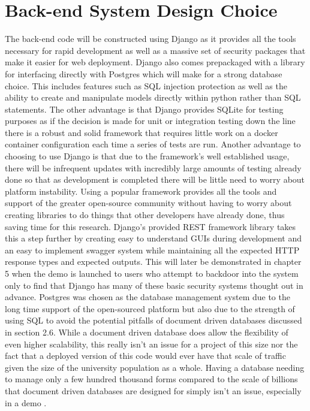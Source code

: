 \section{Back-end System Design Choice}

The back-end code will be constructed using Django as it provides all the tools necessary for rapid development as well as a massive set of security packages that make it easier for web deployment. Django also comes prepackaged with a library for interfacing directly with Postgres which will make for a strong database choice. This includes features such as SQL injection protection as well as the ability to create and manipulate models directly within python rather than SQL statements. The other advantage is that Django provides SQLite for testing purposes as if the decision is made for unit or integration testing down the line there is a robust and solid framework that requires little work on a docker container configuration each time a series of tests are run.
\newline
\newline
Another advantage to choosing to use Django is that due to the framework’s well established usage, there will be infrequent updates with incredibly large amounts of testing already done so that as development is completed there will be little need to worry about platform instability. Using a popular framework provides all the tools and support of the greater open-source community without having to worry about creating libraries to do things that other developers have already done, thus saving time for this research. Django’s provided REST framework library takes this a step further by creating easy to understand GUIs during development and an easy to implement swagger system while maintaining all the expected HTTP response types and expected outputs. This will later be demonstrated in chapter 5 when the demo is launched to users who attempt to backdoor into the system only to find that Django has many of these basic security systems thought out in advance.
\newline
\newline
Postgres was chosen as the database management system due to the long time support of the open-sourced platform but also due to the strength of using SQL to avoid the potential pitfalls of document driven databases discussed in section 2.6. While a document driven database does allow the flexibility of even higher scalability, this really isn't an issue for a project of this size nor the fact that a deployed version of this code would ever have that scale of traffic given the size of the university population as a whole. Having a database needing to manage only a few hundred thousand forms compared to the scale of billions that document driven databases are designed for simply isn’t an issue, especially in a demo \cite{Li_Manoharan_2013}.

